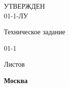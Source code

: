 
\begin{flushleft}
\begin{varwidth}{\linewidth}\centering
	\large
	УТВЕРЖДЕН \\
	{\docId} 01-1-ЛУ
\end{varwidth}
\end{flushleft}

\vskip4cm

{\Large\uppercase{\docTitle}}

\vskip1cm

{\large
	Техническое задание

	{\docId} 01-1
}

\vskip1cm

Листов \pageref*{LastPage}

\vfill
\textbf{Москва \YEAR}